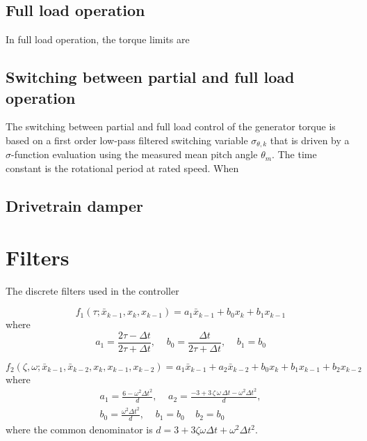\subsection{Full load operation}

In full load operation, the torque limits are 


\subsection{Switching between partial and full load operation}

The switching between partial and full load control of the generator torque is based on a first order low-pass filtered switching variable $\sigma_{\theta,k}$ that is driven by a $\sigma$-function evaluation using the measured mean pitch angle $\theta_m$. The time constant is the rotational period at rated speed. When 




\subsection{Drivetrain damper}





\section{Filters}

The discrete filters used in the controller 


\begin{equation}
\label{e:f1}
f_1 \left(\tau; \bar x_{k-1} , x_{k} , x_{k-1} \right) = a_1 \bar x_{k-1} + b_0 x_k + b_1 x_{k-1}
\end{equation}
where
\begin{equation}
\label{e:f1coef}
a_1=\frac {2\tau-\Delta t}{2\tau+\Delta t} , \;\;\;\; b_0 = \frac {\Delta t}{2\tau+\Delta t}, \;\;\;\; b_1 = b_0
\end{equation}


\begin{equation}
\label{e:f2}
f_2 \left(\zeta, \omega; \bar x_{k-1} , \bar x_{k-2} , x_{k} , x_{k-1} , x_{k-2} \right) = a_1 \bar x_{k-1} + a_2 \bar x_{k-2} + b_0 x_k + b_1 x_{k-1}+ b_2 x_{k-2}
\end{equation}
where
\begin{gather}\nonumber
a_1=\frac {6-\omega^2 \Delta t^2}{d},
\;\;\;\;
a_2=\frac {-3+3\,\zeta\,\omega\,\Delta t-\omega^2\Delta t^2}{d}, \\
\label{e:f2coef}
b_0= \frac {\omega^2\Delta t^2}{d}, \;\;\;\; b_1 = b_0\;\;\;\; b_2 = b_0
\end{gather}
where the common denominator is $d=3+3 \zeta \omega \Delta t+\omega^2 \Delta t^2$.

